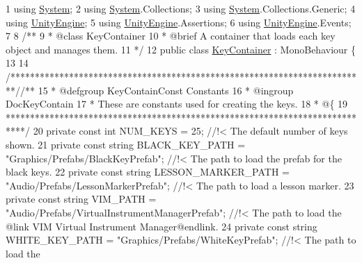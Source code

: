 \begin{DoxyCodeInclude}
1 \textcolor{keyword}{using} \hyperlink{namespace_system}{System};
2 \textcolor{keyword}{using} \hyperlink{namespace_system}{System}.Collections;
3 \textcolor{keyword}{using} \hyperlink{namespace_system}{System}.Collections.Generic;
4 \textcolor{keyword}{using} \hyperlink{namespace_unity_engine}{UnityEngine};
5 \textcolor{keyword}{using} \hyperlink{namespace_unity_engine}{UnityEngine}.Assertions;
6 \textcolor{keyword}{using} \hyperlink{namespace_unity_engine}{UnityEngine}.Events;
7 \textcolor{comment}{}
8 \textcolor{comment}{/** }
9 \textcolor{comment}{ * @class KeyContainer}
10 \textcolor{comment}{ * @brief A container that loads each key object and manages them.}
11 \textcolor{comment}{*/}
12 \textcolor{keyword}{public} \textcolor{keyword}{class }\hyperlink{class_key_container}{KeyContainer} : MonoBehaviour \{
13 
14     \textcolor{comment}{/*************************************************************************/}\textcolor{comment}{/** }
15 \textcolor{comment}{    * @defgroup KeyContainConst Constants}
16 \textcolor{comment}{    * @ingroup DocKeyContain}
17 \textcolor{comment}{    * These are constants used for creating the keys.}
18 \textcolor{comment}{    * @\{}
19 \textcolor{comment}{    ****************************************************************************/}
20     \textcolor{keyword}{private} \textcolor{keyword}{const} \textcolor{keywordtype}{int} NUM\_KEYS = 25; \textcolor{comment}{//!< The default number of keys shown.}
21 \textcolor{comment}{}    \textcolor{keyword}{private} \textcolor{keyword}{const} \textcolor{keywordtype}{string} BLACK\_KEY\_PATH = \textcolor{stringliteral}{"Graphics/Prefabs/BlackKeyPrefab"}; \textcolor{comment}{//!< The path to load the
       prefab for the black keys.}
22 \textcolor{comment}{}    \textcolor{keyword}{private} \textcolor{keyword}{const} \textcolor{keywordtype}{string} LESSON\_MARKER\_PATH = \textcolor{stringliteral}{"Audio/Prefabs/LessonMarkerPrefab"}; \textcolor{comment}{//!< The path to load a
       lesson marker.}
23 \textcolor{comment}{}    \textcolor{keyword}{private} \textcolor{keyword}{const} \textcolor{keywordtype}{string} VIM\_PATH = \textcolor{stringliteral}{"Audio/Prefabs/VirtualInstrumentManagerPrefab"}; \textcolor{comment}{//!< The path to load
       the @link VIM Virtual Instrument Manager@endlink.}
24 \textcolor{comment}{}    \textcolor{keyword}{private} \textcolor{keyword}{const} \textcolor{keywordtype}{string} WHITE\_KEY\_PATH = \textcolor{stringliteral}{"Graphics/Prefabs/WhiteKeyPrefab"}; \textcolor{comment}{//!< The path to load the
}
\end{DoxyCodeInclude}
